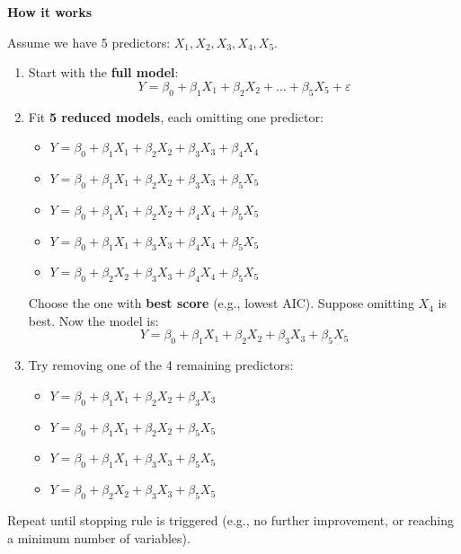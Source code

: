 \highspace
\begin{flushleft}
    \textcolor{Green3}{ \textbf{How it works}}
\end{flushleft}
Assume we have 5 predictors: $X_1, X_2, X_3, X_4, X_5$.
\begin{enumerate}
    \item Start with the \textbf{full model}:
    \begin{equation*}
        Y = \beta_0 + \beta_1 X_1 + \beta_2 X_2 + \dots + \beta_5 X_5 + \varepsilon
    \end{equation*}

    \item Fit \textbf{5 reduced models}, each omitting one predictor:
    \begin{itemize}
        \item $Y = \beta_0 + \beta_1 X_1 + \beta_2 X_2 + \beta_3 X_3 + \beta_4 X_4$
        \item $Y = \beta_0 + \beta_1 X_1 + \beta_2 X_2 + \beta_3 X_3 + \beta_5 X_5$
        \item $Y = \beta_0 + \beta_1 X_1 + \beta_2 X_2 + \beta_4 X_4 + \beta_5 X_5$
        \item $Y = \beta_0 + \beta_1 X_1 + \beta_3 X_3 + \beta_4 X_4 + \beta_5 X_5$
        \item $Y = \beta_0 + \beta_2 X_2 + \beta_3 X_3 + \beta_4 X_4 + \beta_5 X_5$
    \end{itemize}
    Choose the one with \textbf{best score} (e.g., lowest AIC). Suppose omitting $X_4$ is best. Now the model is:
    \begin{equation*}
        Y = \beta_0 + \beta_1 X_1 + \beta_2 X_2 + \beta_3 X_3 + \beta_5 X_5
    \end{equation*}

    \item Try removing one of the 4 remaining predictors:
    \begin{itemize}
        \item $Y = \beta_0 + \beta_1 X_1 + \beta_2 X_2 + \beta_3 X_3$
        \item $Y = \beta_0 + \beta_1 X_1 + \beta_2 X_2 + \beta_5 X_5$
        \item $Y = \beta_0 + \beta_1 X_1 + \beta_3 X_3 + \beta_5 X_5$
        \item $Y = \beta_0 + \beta_2 X_2 + \beta_3 X_3 + \beta_5 X_5$
    \end{itemize}
\end{enumerate}
Repeat until stopping rule is triggered (e.g., no further improvement, or reaching a minimum number of variables).

